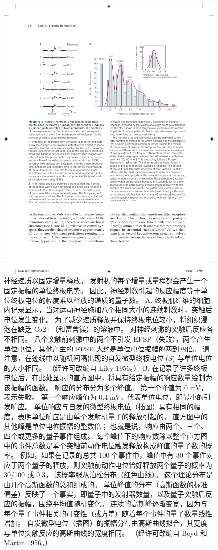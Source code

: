 \begin{figure}[htbp]
	\centering
	\includegraphics[width=0.8\linewidth]{chap15/fig_15_6}
	\caption{神经递质以固定增量释放。 发射机的每个增量或量程都会产生一个固定振幅的单位终板电势。 因此，神经刺激引起的反应幅度等于单位终板电位的幅度乘以释放的递质的量子数。 A. 终板肌纤维的细胞内记录显示，当对运动神经施加八个相同大小的连续刺激时，突触后电位发生变化。 为了减少递质释放并保持终板电位较小，将组织浸泡在缺乏 Ca2+（和富含镁）的溶液中。 对神经刺激的突触后反应各不相同。 八个突触前刺激中的两个不引发 EPSP（失败），两个产生单位电位，其他产生的 EPSP 大约是单位电位振幅的两到四倍。 请注意，在迹线中以随机间隔出现的自发微型终板电位 (S) 与单位电位的大小相同。 （经许可改编自 Liley 1956。） B. 在记录了许多终板电位后，在此处显示的直方图中，将具有给定振幅的响应数量绘制为该振幅的函数。 响应的分布分为多个峰值。 第一个峰值为 0 mV，表示失败。 第一个响应峰值为 0.4 mV，代表单位电位，即最小的引发响应。 单位响应与自发的微型终板电位（插图）具有相同的幅度，表明单位响应是由单个发射机量子的释放引起的。 直方图中的其他峰是单位电位振幅的整数倍； 也就是说，响应由两个、三个、四个或更多的量子事件组成。 每个峰值下的响应数除以整个直方图中的事件总数是单个突触前动作电位触发释放构成峰值的量子数的概率。 例如，如果在记录的总共 100 个事件中，峰值中有 30 个事件对应于两个量子的释放，则突触前动作电位恰好释放两个量子的概率为 30/100 或 0.3。 该概率服从泊松分布（红色曲线）。 这个理论分布是由几个高斯函数的总和组成的。 单位峰值的分布（高斯函数的标准偏差）反映了一个事实，即量子中的发射器数量，以及量子突触后反应的振幅，围绕平均值随机变化。 连续的高斯峰逐渐变宽，因为与每个量子事件相关的可变性（或方差）随着每个事件的量子数量线性增加。 自发微型电位（插图）的振幅分布由高斯曲线拟合，其宽度与单位突触反应的高斯曲线的宽度相同。 （经许可改编自 Boyd 和 Martin 1956。）}
	\label{fig:15_6}
\end{figure}


